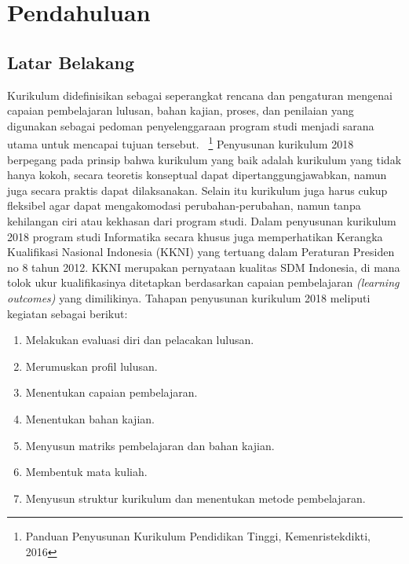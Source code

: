 \chapter{Pendahuluan}
\label{chap:Pendahuluan}
   
\section{Latar Belakang}
\label{sec:Latar Belakang}
Kurikulum didefinisikan sebagai seperangkat rencana dan pengaturan mengenai capaian pembelajaran 
lulusan, bahan kajian, proses, dan penilaian yang digunakan sebagai pedoman penyelenggaraan program studi menjadi sarana utama untuk mencapai tujuan tersebut.
~\cite{nasional:05:kurikulum}\footnote{Panduan Penyusunan Kurikulum Pendidikan Tinggi, Kemenristekdikti, 2016} Penyusunan kurikulum 2018 berpegang pada prinsip bahwa 
kurikulum yang baik adalah kurikulum yang tidak hanya kokoh, secara teoretis konseptual dapat dipertanggungjawabkan, namun juga secara praktis dapat dilaksanakan. Selain itu kurikulum juga harus cukup fleksibel agar dapat mengakomodasi perubahan-perubahan, namun tanpa kehilangan ciri atau kekhasan dari program studi. Dalam penyusunan kurikulum 2018 program studi Informatika secara khusus juga memperhatikan Kerangka Kualifikasi Nasional Indonesia (KKNI) yang tertuang dalam Peraturan Presiden no 8 tahun 2012. KKNI merupakan pernyataan kualitas SDM Indonesia, di mana tolok ukur kualifikasinya ditetapkan berdasarkan capaian pembelajaran \textit{(learning outcomes)} yang dimilikinya. Tahapan penyusunan kurikulum 2018 meliputi kegiatan sebagai berikut: 
\begin{enumerate}
\item Melakukan evaluasi diri dan pelacakan lulusan.
\item Merumuskan profil lulusan.
\item Menentukan capaian pembelajaran.
\item Menentukan bahan kajian.
\item Menyusun matriks pembelajaran dan bahan kajian.
\item Membentuk mata kuliah.
\item Menyusun struktur kurikulum dan menentukan metode pembelajaran.
\end{enumerate}


